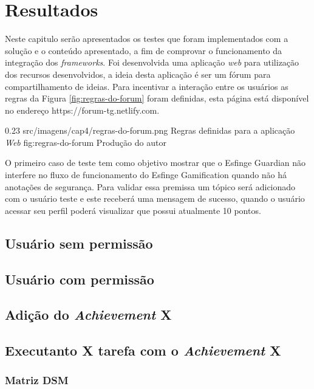\newpage
\chapter{Resultados}
Neste capitulo serão apresentados os testes que foram implementados com a solução e o conteúdo apresentado, a fim de comprovar o funcionamento da integração dos \textit{frameworks}. Foi desenvolvida uma aplicação \textit{web} para utilização dos recursos desenvolvidos, a ideia desta aplicação é ser um fórum para compartilhamento de ideias. Para incentivar a interação entre os usuários as regras da Figura \ref{fig:regras-do-forum} foram definidas, esta página está disponível no endereço https://forum-tg.netlify.com.

\begin{image}
{0.23}
{src/imagens/cap4/regras-do-forum.png}
{Regras definidas para a aplicação \textit{Web}}
{fig:regras-do-forum}
{Produção do autor}
\end{image}



\par O primeiro caso de teste tem como objetivo mostrar que o Esfinge Guardian não interfere no fluxo de funcionamento do Esfinge Gamification quando não há anotações de segurança. Para validar essa premissa um tópico será adicionado com o usuário teste e este receberá uma mensagem de sucesso, quando o usuário acessar seu perfil poderá visualizar que possui atualmente 10 pontos.

\section{Usuário sem permissão}

\section{Usuário com permissão}

\section{Adição do \textit{Achievement} X}

\section{Executanto X tarefa com o \textit{Achievement} X}

\subsection{Matriz DSM}
